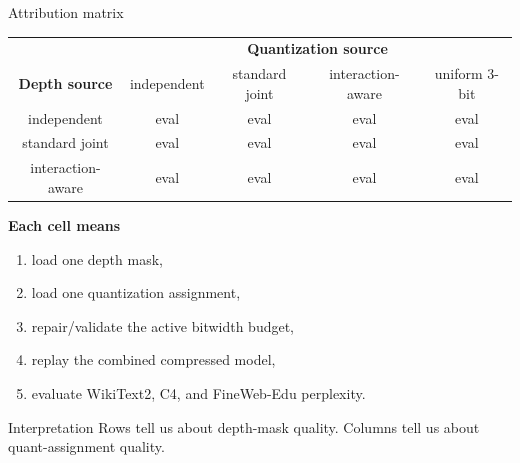 \documentclass[aspectratio=169]{beamer}
\begin{document}
\begin{frame}{Attribution matrix}
\begin{center}
\begin{tabular}{c|cccc}
 & \multicolumn{4}{c}{\textbf{Quantization source}} \\
\textbf{Depth source} & independent & standard joint & interaction-aware & uniform 3-bit \\
\hline
independent & eval & eval & eval & eval \\
standard joint & eval & eval & eval & eval \\
interaction-aware & eval & eval & eval & eval \\
\end{tabular}
\end{center}

\vspace{0.3cm}
\textbf{Each cell means}
\begin{enumerate}
    \item load one depth mask,
    \item load one quantization assignment,
    \item repair/validate the active bitwidth budget,
    \item replay the combined compressed model,
    \item evaluate WikiText2, C4, and FineWeb-Edu perplexity.
\end{enumerate}

\vspace{0.15cm}
\begin{block}{Interpretation}
Rows tell us about depth-mask quality. Columns tell us about quant-assignment quality.
\end{block}
\end{frame}

\end{document}
